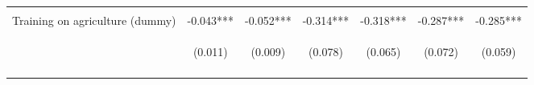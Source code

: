 \begin{center}
\begin{tabular}{lcccccc}
\vspace{4pt} & \begin{footnotesize}[0.000]\end{footnotesize} & \begin{footnotesize}[0.000]\end{footnotesize} & \begin{footnotesize}[0.000]\end{footnotesize} & \begin{footnotesize}[0.000]\end{footnotesize} & \begin{footnotesize}[0.000]\end{footnotesize} & \begin{footnotesize}[0.000]\end{footnotesize} \\
Training on agriculture (dummy) & -0.043*** & -0.052*** & -0.314*** & -0.318*** & -0.287*** & -0.285*** \\
 & \begin{footnotesize}(0.011)\end{footnotesize} & \begin{footnotesize}(0.009)\end{footnotesize} & \begin{footnotesize}(0.078)\end{footnotesize} & \begin{footnotesize}(0.065)\end{footnotesize} & \begin{footnotesize}(0.072)\end{footnotesize} & \begin{footnotesize}(0.059)\end{footnotesize} \\
\vspace{4pt} & \begin{footnotesize}[0.000]\end{footnotesize} & \begin{footnotesize}[0.000]\end{footnotesize} & \begin{footnotesize}[0.000]\end{footnotesize} & \begin{footnotesize}[0.000]\end{footnotesize} & \begin{footnotesize}[0.000]\end{footnotesize} & \begin{footnotesize}[0.000]\end{footnotesize} \\

\end{tabular}
\end{center}
